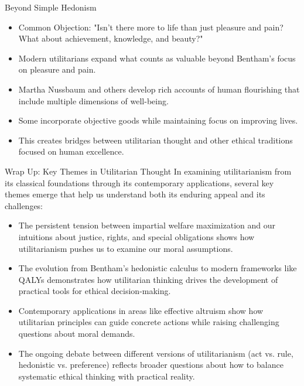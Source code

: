 \documentclass[aspectratio=169]{beamer}
\begin{document}
\begin{frame}{Beyond Simple Hedonism}
\begin{itemize}
    \item Common Objection: "Isn't there more to life than just pleasure and pain? What about achievement, knowledge, and beauty?"
    \item Modern utilitarians expand what counts as valuable beyond Bentham's focus on pleasure and pain.
    \item Martha Nussbaum and others develop rich accounts of human flourishing that include multiple dimensions of well-being.
    \item Some incorporate objective goods while maintaining focus on improving lives.
    \item This creates bridges between utilitarian thought and other ethical traditions focused on human excellence.
\end{itemize}
\end{frame}

\begin{frame}{Wrap Up: Key Themes in Utilitarian Thought}
    In examining utilitarianism from its classical foundations through its contemporary applications, several key themes emerge that help us understand both its enduring appeal and its challenges:
    
    \begin{itemize}
        \item The persistent tension between impartial welfare maximization and our intuitions about justice, rights, and special obligations shows how utilitarianism pushes us to examine our moral assumptions.
        
        \item The evolution from Bentham's hedonistic calculus to modern frameworks like QALYs demonstrates how utilitarian thinking drives the development of practical tools for ethical decision-making.
        
        \item Contemporary applications in areas like effective altruism show how utilitarian principles can guide concrete actions while raising challenging questions about moral demands.
        
        \item The ongoing debate between different versions of utilitarianism (act vs. rule, hedonistic vs. preference) reflects broader questions about how to balance systematic ethical thinking with practical reality.
    \end{itemize}
\end{frame}
\end{document}

